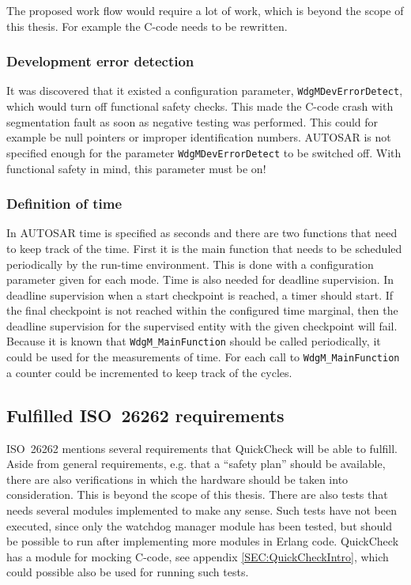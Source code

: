 The proposed work flow would require a lot of work, which is beyond the scope of
this thesis. For example the C-code needs to be rewritten.

\subsubsection{Development error detection}
\label{SEC:DEVERRORDETECT}
It was discovered that it existed a configuration parameter,
\lstinline!WdgMDevErrorDetect!, which would turn off functional safety
checks. This made the C-code crash with segmentation fault as soon as
negative testing was performed. This could for example be null pointers or
improper identification numbers. AUTOSAR is not specified enough for
the parameter \lstinline!WdgMDevErrorDetect!  to be switched off. With
functional safety in mind, this parameter must be on!

\subsubsection{Definition of time}
\label{SEC:FUNCTIONAL_SAFETY_TIME}
In AUTOSAR time is specified as seconds and there are two functions that need to
keep track of the time. First it is the main function that needs to be scheduled
periodically by the run-time environment. This is done with a configuration
parameter given for each mode. Time is also needed for deadline supervision. In
deadline supervision when a start checkpoint is reached, a timer should
start. If the final checkpoint is not reached within the configured time
marginal, then the deadline supervision for the supervised entity with the given
checkpoint will fail. Because it is known that \lstinline!WdgM_MainFunction! should
be called periodically, it could be used for the measurements of time. For each
call to \lstinline!WdgM_MainFunction! a counter could be incremented to keep
track of the cycles.%


\subsection{Fulfilled ISO~26262 requirements}
ISO~26262 mentions several requirements that QuickCheck will be able to
fulfill. Aside from general requirements, e.g. that a ``safety plan'' should be
available, there are also verifications in which the hardware should be taken into
consideration. This is beyond the scope of this thesis. %
There are also tests that needs several modules
implemented to make any sense. Such tests have not been executed, since only the
watchdog manager module has been tested, but should be possible to run after
implementing more modules in Erlang code. QuickCheck has a module for
mocking C-code, see appendix \ref{SEC:QuickCheckIntro}, which could
possible also be used for running such tests.

